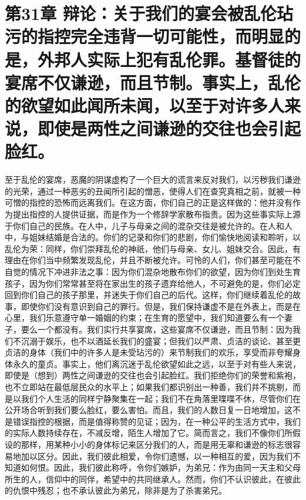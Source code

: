 
\section{第31章 辩论：关于我们的宴会被乱伦玷污的指控完全违背一切可能性，而明显的是，外邦人实际上犯有乱伦罪。基督徒的宴席不仅谦逊，而且节制。事实上，乱伦的欲望如此闻所未闻，以至于对许多人来说，即使是两性之间谦逊的交往也会引起脸红。}

至于乱伦的宴席，恶魔的阴谋虚构了一个巨大的谎言来反对我们，以污秽我们谦逊的光荣，通过一种恶劣的丑闻所引起的憎恶，使得人们在查究真相之前，就被一种可憎的指控的恐怖而远离我们。在这方面，你们自己的正是这样做的：他并没有作为提出指控的人提供证据，而是作为一个修辞学家散布指责。因为这些事实际上源于你们自己的民族。在人中，儿子与母亲之间的混杂交往是被允许的。在人和人中，与姐妹结婚是合法的。你们的记录和你们的悲剧，你们愉快地阅读和聆听，以乱伦为荣：同样，你们崇拜乱伦的神祇，他们与母亲、女儿、姐妹交合。因此，有理由在你们当中频繁发现乱伦，并且不断被允许。可怜的人们，你们甚至可能在不自觉的情况下冲进非法之事：因为你们混杂地散布你们的欲望，因为你们到处生育孩子，因为你们常常甚至将在家出生的孩子遗弃给他人，不可避免的是，你们必定回到你们自己的孩子那里，并迷失于你们自己的后代。这样，你们继续着乱伦的故事，即使你们没有意识到自己的罪行。但是，我们保持谦虚不是在外表上，而是在心里，我们乐意遵守单一婚姻的约束；在生育的愿望中，我们知道要么有一个妻子，要么一个都没有。我们实行共享宴席，这些宴席不仅谦逊，而且节制：因为我们不沉溺于娱乐，也不以酒延长我们的盛宴；但我们以严肃、贞洁的谈论、甚至更贞洁的身体（我们中的许多人是未受玷污的）来节制我们的欢乐，享受而非夸耀身体永久的童贞。事实上，他们离沉迷于乱伦欲望如此之远，以至于对有些人来说，即使是（想到）两性之间谦逊的交往也会引起脸红。我们拒绝你们的荣誉和紫袍，也不立即站在最低层民众的水平上；如果我们都识别出一种善，我们并不挑剔，而是以我们个人生活的同样宁静聚集在一起；我们不在角落里喋喋不休，尽管你们在公开场合听到我们要么脸红，要么害怕。而且，我们的人数日复一日地增加，这不是错误指控的根据，而是值得称赞的见证；因为，在一种公平的生活方式中，我们的实际人数持续存在，不减反增，陌生人增加了它。简而言之，我们不像你们所假设的那样，用某种小小的身体标记来区分我们的人，而是用无辜和谦逊的标志很容易地加以区分。因此，我们彼此相爱，令你们遗憾，以一种相互的爱，因为我们不知道如何恨。因此，我们彼此称呼，令你们嫉妒，为弟兄：作为由同一天主和父母所生的人，信仰中的同伴，希望中的共同继承人。然而，你们不认识彼此，在彼此的仇恨中残忍；也不承认彼此为弟兄，除非是为了杀害弟兄。\par

